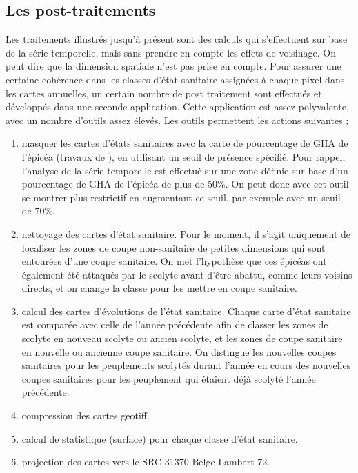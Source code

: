 \documentclass[a4paper, 12pt]{article} %
\begin{document}
\subsection{Les post-traitements}

Les traitements illustrés jusqu'à présent sont des calculs qui s'effectuent sur base de la série temporelle, mais sans prendre en compte les effets de voisinage. On peut dire que la dimension spatiale n'est pas prise en compte. Pour assurer une certaine cohérence dans les classes d'état sanitaire assignées à chaque pixel dans les cartes annuelles, un certain nombre de post traitement sont effectués et développés dans une seconde application. Cette application est assez polyvalente, avec un nombre d'outils assez élevés. Les outils permettent les actions suivantes ;
\begin{enumerate}\addtocounter{enumi}{-1}
	
	\item masquer les cartes d'états sanitaires avec la carte de pourcentage de GHA de l'épicéa (travaux de \citep{bolyn_forest_2018}), en utilisant un seuil de présence spécifié. Pour rappel, l'analyse de la série temporelle est effectué sur une zone définie sur base d'un pourcentage de GHA de l'épicéa de plus de 50\%. On peut donc avec cet outil se montrer plus restrictif en augmentant ce seuil, par exemple avec un seuil de 70\%.
	\item nettoyage des cartes d'état sanitaire. Pour le moment, il s'agit uniquement de localiser les zones de coupe non-sanitaire de petites dimensions qui sont entourées d'une coupe sanitaire. On met l'hypothèse que ces épicéas ont également été attaqués par le scolyte avant d'être abattu, comme leurs voisins directs, et on change la classe pour les mettre en coupe sanitaire.
	\item calcul des cartes d'évolutions de l'état sanitaire. Chaque carte d'état sanitaire est comparée avec celle de l'année précédente afin de classer les zones de scolyte en nouveau scolyte ou ancien scolyte, et les zones de coupe sanitaire en nouvelle ou ancienne coupe sanitaire. On distingue les nouvelles coupes sanitaires pour les peuplements scolytés durant l'année en cours des nouvelles coupes sanitaires pour les peuplement qui étaient déjà scolyté l'année précédente.
	\item  compression des cartes geotiff
	\item calcul de statistique (surface) pour chaque classe d'état sanitaire.
	\item projection des cartes vers le SRC 31370 Belge Lambert 72.
\end{enumerate}
\end{document}
